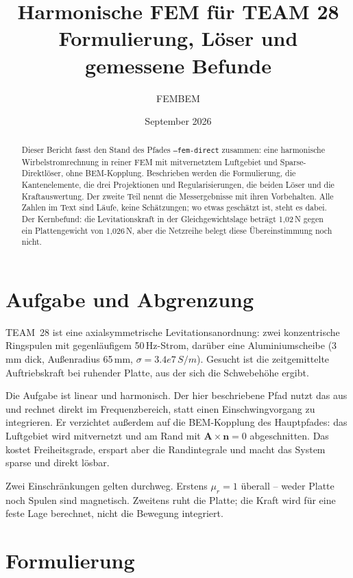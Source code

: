 \documentclass[11pt,a4paper]{article}
\title{Harmonische FEM für TEAM 28\\[0.3em]
       \large Formulierung, Löser und gemessene Befunde}
\author{FEMBEM}
\date{September 2026}
\begin{document}
\maketitle

\begin{abstract}
\noindent
Dieser Bericht fasst den Stand des Pfades \texttt{--fem-direct} zusammen: eine
harmonische Wirbelstromrechnung in reiner FEM mit mitvernetztem Luftgebiet und
Sparse-Direktlöser, ohne BEM-Kopplung. Beschrieben werden die Formulierung, die
Kantenelemente, die drei Projektionen und Regularisierungen, die beiden Löser
und die Kraftauswertung. Der zweite Teil nennt die Messergebnisse mit ihren
Vorbehalten. Alle Zahlen im Text sind Läufe, keine Schätzungen; wo etwas
geschätzt ist, steht es dabei. Der Kernbefund: die Levitationskraft in der
Gleichgewichtslage beträgt 1,02\,N gegen ein Plattengewicht von
1,026\,N, aber die Netzreihe belegt diese Übereinstimmung noch nicht.
\end{abstract}

\tableofcontents

\section{Aufgabe und Abgrenzung}

TEAM~28 ist eine axialsymmetrische Levitationsanordnung: zwei konzentrische
Ringspulen mit gegenläufigem 50\,Hz-Strom, darüber eine
Aluminiumscheibe (3\,mm dick, Außenradius 65\,mm,
$\sigma = 3.4e7\,S/m$). Gesucht ist die zeitgemittelte
Auftriebskraft bei ruhender Platte, aus der sich die Schwebehöhe ergibt.

Die Aufgabe ist linear und harmonisch. Der hier beschriebene Pfad nutzt das
aus und rechnet direkt im Frequenzbereich, statt einen Einschwingvorgang zu
integrieren. Er verzichtet außerdem auf die BEM-Kopplung des Hauptpfades: das
Luftgebiet wird mitvernetzt und am Rand mit $\mathbf{A}\times\mathbf{n} = 0$
abgeschnitten. Das kostet Freiheitsgrade, erspart aber die Randintegrale und
macht das System sparse und direkt lösbar.

Zwei Einschränkungen gelten durchweg. Erstens $\mu_r = 1$ überall -- weder
Platte noch Spulen sind magnetisch. Zweitens ruht die Platte; die Kraft wird
für eine feste Lage berechnet, nicht die Bewegung integriert.

\section{Formulierung}
\end{document}
